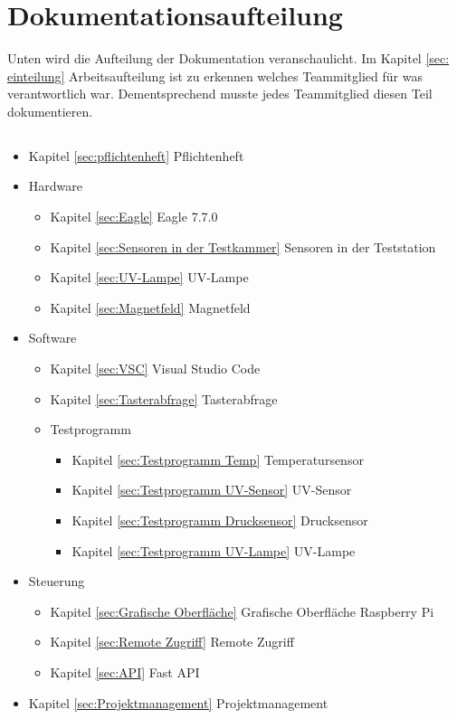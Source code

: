 \section{Dokumentationsaufteilung}

Unten wird die Aufteilung der Dokumentation veranschaulicht. Im Kapitel \ref{sec: einteilung} Arbeitsaufteilung ist zu erkennen welches Teammitglied für was verantwortlich war. Dementsprechend musste jedes Teammitglied diesen Teil dokumentieren. 

\subsection{\nameSH}
\begin{itemize}
    \item Kapitel \ref{sec:pflichtenheft} Pflichtenheft
    \item Hardware
    \begin{itemize}
        \item Kapitel \ref{sec:Eagle} Eagle 7.7.0 
        \item Kapitel \ref{sec:Sensoren in der Testkammer} Sensoren in der Teststation 
        \item Kapitel \ref{sec:UV-Lampe} UV-Lampe 
        \item Kapitel \ref{sec:Magnetfeld} Magnetfeld 
    \end{itemize}
    \item Software
    \begin{itemize}
        \item Kapitel \ref{sec:VSC} Visual Studio Code 
        \item Kapitel \ref{sec:Tasterabfrage} Tasterabfrage 
        \item Testprogramm
        \begin{itemize}
            \item Kapitel \ref{sec:Testprogramm Temp} Temperatursensor  
            \item Kapitel \ref{sec:Testprogramm UV-Sensor} UV-Sensor 
            \item Kapitel \ref{sec:Testprogramm Drucksensor} Drucksensor 
            \item Kapitel \ref{sec:Testprogramm UV-Lampe} UV-Lampe 
        \end{itemize}
    \end{itemize}
    \item Steuerung
    \begin{itemize}
        \item Kapitel \ref{sec:Grafische Oberfläche} Grafische Oberfläche Raspberry Pi 
        \item Kapitel \ref{sec:Remote Zugriff} Remote Zugriff 
        \item Kapitel \ref{sec:API} Fast API 
    \end{itemize}
    \item Kapitel \ref{sec:Projektmanagement} Projektmanagement
\end{itemize}

